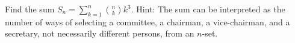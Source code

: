 Find the sum $S_n = \sum_{k=1}^n \binom{n}{k}k^3$. Hint: The sum can be interpreted as the number of ways of selecting a committee, a chairman, a vice-chairman, and a secretary, not necessarily different persons, from an $n$-set.
